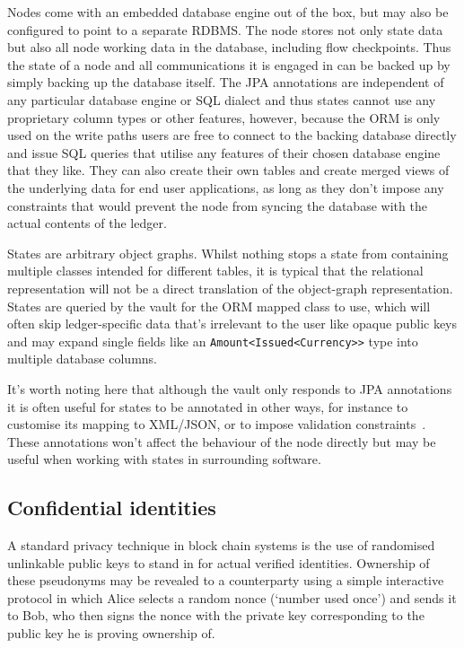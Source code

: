 \documentclass{article}
\begin{document}
Nodes come with an embedded database engine out of the box, but may also be configured to point to a separate
RDBMS. The node stores not only state data but also all node working data in the database, including flow
checkpoints. Thus the state of a node and all communications it is engaged in can be backed up by simply backing up
the database itself. The JPA annotations are independent of any particular database engine or SQL dialect and thus
states cannot use any proprietary column types or other features, however, because the ORM is only used on the
write paths users are free to connect to the backing database directly and issue SQL queries that utilise any
features of their chosen database engine that they like. They can also create their own tables and create merged
views of the underlying data for end user applications, as long as they don't impose any constraints that would
prevent the node from syncing the database with the actual contents of the ledger.

States are arbitrary object graphs. Whilst nothing stops a state from containing multiple classes intended for
different tables, it is typical that the relational representation will not be a direct translation of the
object-graph representation. States are queried by the vault for the ORM mapped class to use, which will often skip
ledger-specific data that's irrelevant to the user like opaque public keys and may expand single fields like an
\texttt{Amount<Issued<Currency>>} type into multiple database columns.

It's worth noting here that although the vault only responds to JPA annotations it is often useful for states to be
annotated in other ways, for instance to customise its mapping to XML/JSON, or to impose validation
constraints~\cite{BeanValidation}. These annotations won't affect the behaviour of the node directly but may be
useful when working with states in surrounding software.

\subsection{Confidential identities}\label{sec:confidential-identities}

A standard privacy technique in block chain systems is the use of randomised unlinkable public keys to stand in for
actual verified identities. Ownership of these pseudonyms may be revealed to a counterparty using a simple
interactive protocol in which Alice selects a random nonce (`number used once') and sends it to Bob, who then signs
the nonce with the private key corresponding to the public key he is proving ownership of.
\end{document}
